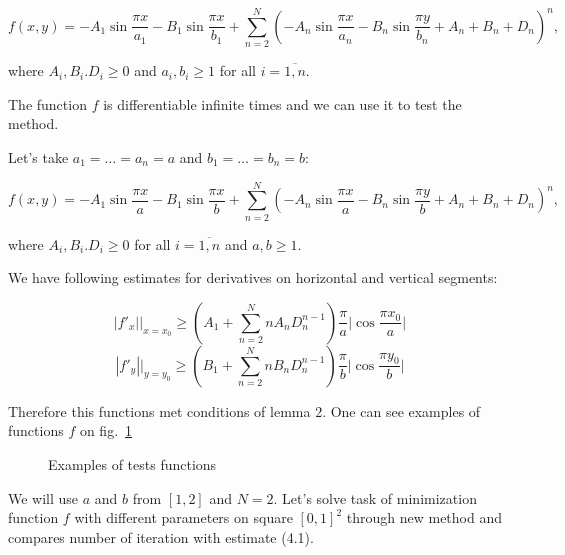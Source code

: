 \documentclass[12pt]{article}
\begin{document}
$$f(x,y) = -A_1\sin\frac{\pi x}{a_1} - B_1\sin\frac{\pi x}{b_1} + \sum\limits_{n=2}^N\left(-A_n\sin\frac{\pi x}{a_n} - B_n\sin\frac{\pi y}{b_n} + A_n + B_n + D_n\right)^n,$$

where $A_i, B_i. D_i\geq 0$ and $a_i, b_i \geq 1$ for all $i = \overline{1, n}$.

The function $f$ is differentiable infinite times and we can use it to test the method.

Let's take $a_1 = \dots = a_n = a$ and $b_1 = \dots = b_n = b$:

$$f(x,y) = -A_1\sin\frac{\pi x}{a} - B_1\sin\frac{\pi x}{b} + \sum\limits_{n=2}^N\left(-A_n\sin\frac{\pi x}{a} - B_n\sin\frac{\pi y}{b} + A_n + B_n + D_n\right)^n,$$

where $A_i, B_i. D_i\geq 0$ for all $i = \overline{1, n}$ and $a, b \geq 1$.

We have following estimates for derivatives on horizontal and vertical segments:

$$|f'_x|\Big|_{x = x_0} \geq \left(A_1 + \sum\limits_{n=2}^N n A_n D_n^{n-1}\right)\frac{\pi}{a}\Big|\cos \frac{\pi x_0}{a}\Big|$$
$$|f'_y|\Big|_{y = y_0} \geq \left(B_1 + \sum\limits_{n=2}^N n B_n D_n^{n-1}\right)\frac{\pi}{b}\Big|\cos \frac{\pi y_0}{b}\Big|$$

Therefore this functions met conditions of lemma 2. One can see examples of functions $f$ on fig.~\ref{fig:examples}

\begin{figure}[h]
\caption{Examples of tests functions}
\label{fig:examples}
\end{figure}

We will use $a$ and $b$ from $[1, 2]$ and $N = 2$. Let's solve task of minimization function $f$ with different parameters on square $[0,1]^2$ through new method and compares number of iteration with estimate (4.1).
\end{document}

